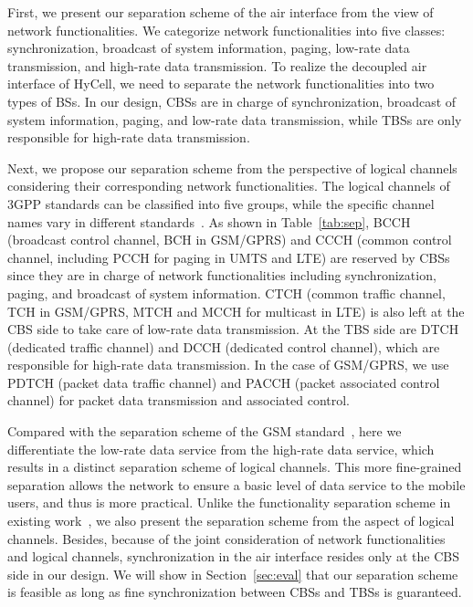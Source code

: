 \documentclass[conference]{IEEEtran}
\begin{document}
First, we present our separation scheme of the air interface
from the view of network functionalities.
We categorize network functionalities into five classes: synchronization, broadcast of system
information, paging, low-rate data transmission, and high-rate data
transmission. To realize the decoupled air interface of HyCell, we need to
separate the network functionalities into two types of BSs. In our design,
CBSs are in charge of synchronization,
broadcast of system information, paging, and low-rate data transmission,
while TBSs are only responsible for high-rate data transmission.

Next, we propose our separation scheme from the perspective of logical channels
considering their corresponding network functionalities.
The logical channels of 3GPP standards can be classified into five groups,
while the specific channel names vary in different standards~\cite{sauter2011from}.
As shown in Table~\ref{tab:sep},
BCCH (broadcast control channel, BCH in GSM/GPRS) and
CCCH (common control channel, including PCCH for paging in UMTS and LTE)
are reserved by CBSs since they are in charge of network functionalities
including synchronization, paging, and broadcast of system information.
CTCH (common traffic channel, TCH in GSM/GPRS, MTCH and MCCH for multicast in LTE)
is also left at the CBS side to take care of low-rate data transmission.
At the TBS side are DTCH (dedicated traffic channel) and DCCH (dedicated
control channel), which are responsible for high-rate data transmission.
In the case of GSM/GPRS, we use PDTCH (packet data traffic channel) and
PACCH (packet associated control channel) for packet data transmission
and associated control.

Compared with the separation scheme of the GSM standard~\cite{zhao2013software},
here we differentiate the low-rate data service from the high-rate data service,
which results in a distinct separation scheme of logical channels.
This more fine-grained separation
allows the network to ensure a basic level of data service to the mobile users,
and thus is more practical.
Unlike the functionality separation scheme in existing
work~\cite{xu2013functionality}, we also present the separation scheme from the
aspect of logical channels. Besides, because of the joint
consideration of network functionalities and logical channels,
synchronization in the air interface resides only at the CBS side in our design.
We will show in Section~\ref{sec:eval}
that our separation scheme is feasible as long as fine synchronization
between CBSs and TBSs is guaranteed.
\end{document}
